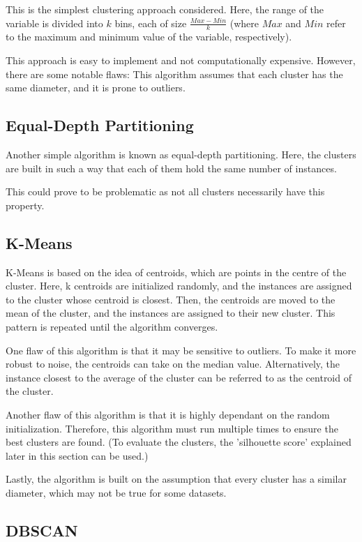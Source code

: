 This is the simplest clustering approach considered. Here, the range of the variable is divided into $k$ bins, each of size $\frac{Max-Min}{k}$ (where $Max$ and $Min$ refer to the maximum and minimum value of the variable, respectively).

This approach is easy to implement and not computationally expensive. However, there are some notable flaws: This algorithm assumes that each cluster has the same diameter, and it is prone to outliers.

\subsection{Equal-Depth Partitioning}

Another simple algorithm is known as equal-depth partitioning. Here, the clusters are built in such a way that each of them hold the same number of instances.

This could prove to be problematic as not all clusters necessarily have this property.

\subsection{K-Means }

K-Means\citep{lloydLeastSquaresQuantization1982} is based on the idea of centroids, which are points in the centre of the cluster. Here, k centroids are initialized randomly, and the instances are assigned to the cluster whose centroid is closest. Then, the centroids are moved to the mean of the cluster, and the instances are assigned to their new cluster. This pattern is repeated until the algorithm converges.

One flaw of this algorithm is that it may be sensitive to outliers. To make it more robust to noise, the centroids can take on the median value. Alternatively, the instance closest to the average of the cluster can be referred to as the centroid of the cluster.

Another flaw of this algorithm is that it is highly dependant on the random initialization. Therefore, this algorithm must run multiple times to ensure the best clusters are found. (To evaluate the clusters, the 'silhouette score' explained later in this section can be used.)

Lastly, the algorithm is built on the assumption that every cluster has a similar diameter, which may not be true for some datasets.

\subsection{DBSCAN}

